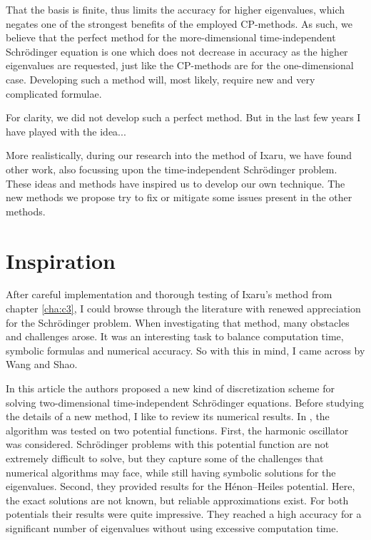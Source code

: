 That the basis is finite, thus limits the accuracy for higher eigenvalues, which negates one of the strongest benefits of the employed CP-methods. As such, we believe that the perfect method for the more-dimensional time-independent Schrödinger equation is one which does not decrease in accuracy as the higher eigenvalues are requested, just like the CP-methods are for the one-dimensional case. Developing such a method will, most likely, require new and very complicated formulae.

For clarity, we did not develop such a perfect method. But in the last few years I have played with the idea...

More realistically, during our research into the method of Ixaru, we have found other work, also focussing upon the time-independent Schrödinger problem. These ideas and methods have inspired us to develop our own technique. The new methods we propose try to fix or mitigate some issues present in the other methods.


\section{Inspiration}

After careful implementation and thorough testing of Ixaru's method from chapter \ref{cha:c3}, I could browse through the literature with renewed appreciation for the Schrödinger problem. When investigating that method, many obstacles and challenges arose. It was an interesting task to balance computation time, symbolic formulas and numerical accuracy. So with this in mind, I came across \cite{wang_new_2009} by Wang and Shao.

In this article the authors proposed a new kind of discretization scheme for solving two-dimensional time-independent Schrödinger equations. Before studying the details of a new method, I like to review its numerical results. In \cite{wang_new_2009}, the algorithm was tested on two potential functions. First, the harmonic oscillator was considered. Schrödinger problems with this potential function are not extremely difficult to solve, but they capture some of the challenges that numerical algorithms may face, while still having symbolic solutions for the eigenvalues. Second, they provided results for the Hénon--Heiles potential. Here, the exact solutions are not known, but reliable approximations exist. For both potentials their results were quite impressive. They reached a high accuracy for a significant number of eigenvalues without using excessive computation time.


